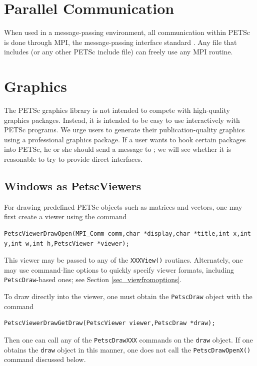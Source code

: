 {{\section{Parallel Communication}

When used in a message-passing environment, all communication 
within
PETSc is done through MPI, the message-passing interface standard
\cite{MPI-final}.  Any file that includes  (or any other
PETSc include file) can freely use any MPI routine.

\section{Graphics}
\label{sec_graphics}

The PETSc graphics library is not intended to compete with
high-quality graphics packages.  Instead, it is intended to be
easy to use interactively with PETSc programs. We urge users
to generate their publication-quality graphics using a
professional graphics package. If a user wants to hook
certain packages into PETSc, he or she should send a message to
\href{mailto:petsc-maint@mcs.anl.gov}{};
we will see whether it is reasonable to try to provide direct interfaces.

\subsection{Windows as PetscViewers}
For drawing predefined PETSc objects such as matrices and vectors, one may
first create a viewer using the
command
\begin{lstlisting}
PetscViewerDrawOpen(MPI_Comm comm,char *display,char *title,int x,int y,int w,int h,PetscViewer *viewer);
\end{lstlisting}
This viewer may be passed to any of the \lstinline{XXXView()} routines.
Alternately, one may use command-line options to quickly specify viewer formats, 
including \lstinline{PetscDraw}-based ones; see Section \ref{sec_viewfromoptions}.

To draw directly into the viewer, one must obtain the \lstinline{PetscDraw} object with the
command
\begin{lstlisting}
PetscViewerDrawGetDraw(PetscViewer viewer,PetscDraw *draw);
\end{lstlisting}
Then one can call any of the \lstinline{PetscDrawXXX} commands on the \lstinline{draw}
object. If one obtains the \lstinline{draw} object in this manner,
one does not call the \lstinline{PetscDrawOpenX()} command discussed below.

}}
